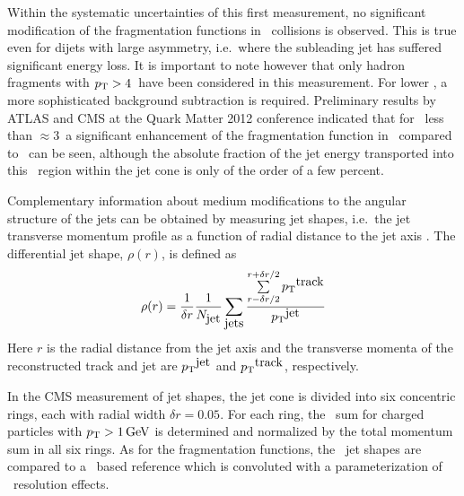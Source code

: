 Within the systematic uncertainties of this first measurement, no significant modification of
the fragmentation functions in \PbPb\ collisions is observed. This is true even for
dijets with large asymmetry, i.e.\ where the subleading jet has suffered significant
energy loss. It is important to note however that only hadron fragments 
with $\mbox{$p_{\mathrm{T}}$} > 4$\GeVc\ have been considered in this measurement. For lower \pT, a more
sophisticated background subtraction is required. Preliminary results by ATLAS and CMS
at the Quark Matter 2012 conference indicated that for \pT\ less than $\approx 3$\GeVc\ a 
significant enhancement of the fragmentation function in \PbPb\ compared to \pp\ can be 
seen, although the absolute fraction of the jet energy transported into this \pT\ region within
the jet cone is only of the order of a few percent.


Complementary information about medium modifications to the angular structure of the jets 
can be obtained by measuring jet shapes, i.e.\ the
jet transverse momentum profile as a function of radial distance to the jet axis
\cite{MehtarTani:2010ma,Idilbi:2008vm,CasalderreySolana:2011rz,
CasalderreySolana:2011rq,Neufeld:2011yh,Blaizot:2012fh,Fickinger:2013xwa}.
The differential jet shape, $\rho(r)$, is defined as~\cite{Chatrchyan:2013kwa}
\begin{equation}
\rho(r) = \frac{1}{\delta r} \frac{1}{N_{\mbox{jet}}} \sum_{\mbox{jets}}
\frac{\sum\limits_{{r - \delta r/2}}^{{r + \delta r/2}}{\mbox{$p_{\mathrm{T}}$}^{\mbox{track}}}}{\mbox{$p_{\mathrm{T}}$}^{\mbox{jet}}}
\label{eq:rho(r)}
\end{equation}
Here $r$ is the radial distance from the jet axis
and the transverse momenta of the reconstructed track and jet are
$\mbox{$p_{\mathrm{T}}$}^{\mbox{jet}}$ and $\mbox{$p_{\mathrm{T}}$}^{\mbox{track}}$, respectively.

In the CMS measurement of jet shapes\cite{Chatrchyan:2013kwa}, the jet cone is divided 
into six concentric rings, each with radial width $\delta r = 0.05$. For each
ring, the \pT\ sum for charged particles with $\mbox{$p_{\mathrm{T}}$} > 1\,\mathrm{GeV}$ is determined and
normalized by the total momentum sum in all six rings. As for the fragmentation
functions, the \PbPb\ jet shapes are compared to a \pp\ based reference which is 
convoluted with a parameterization of \PbPb\ resolution effects.

